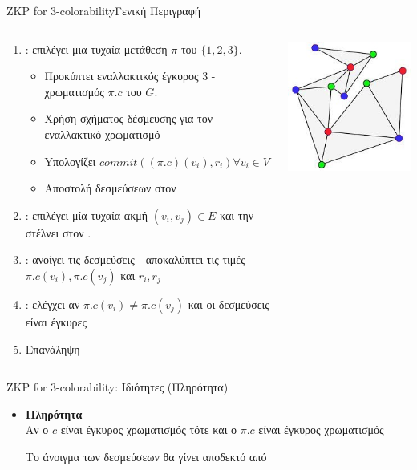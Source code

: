 \documentclass[handout]{beamer}
\begin{document}
\begin{frame}{ZKP for 3-colorability}{Γενική Περιγραφή}
\begin{columns}
\begin{small}
\begin{enumerate}
 	\setlength \itemsep{0.1em}
	\item \prv: επιλέγει μια τυχαία μετάθεση $\pi$ του $\{ 1,2,3 \}$. \pause
	\begin{itemize}
		\item Προκύπτει εναλλακτικός έγκυρος 3 - χρωματισμός $\pi.c$ του $G$. \pause
		\item Χρήση σχήματος δέσμευσης για τον εναλλακτικό χρωματισμό
		\item Yπολογίζει $commit( (\pi.c)(v_i), r_i) \forall v_i \in V$ 
		\item Αποστολή δεσμεύσεων στον \ver \pause
	\end{itemize}
	\item \ver: επιλέγει μία τυχαία ακμή $(v_i, v_j) \in E$ και την στέλνει στον \prv. \pause
	\item \prv: ανοίγει τις δεσμεύσεις - αποκαλύπτει τις τιμές $\pi.c(v_i),\pi.c(v_j)$ και $r_i, r_j$ \pause
	\item \ver: ελέγχει αν $\pi.c(v_i) \neq \pi.c(v_j)$ και οι δεσμεύσεις είναι έγκυρες
	\item Επανάληψη
\end{enumerate}
\end{small}
\begin{center}
\includegraphics[scale=0.6]{3cp2.jpg}
\end{center}
\end{columns}
\end{frame}

 
\begin{frame}{ZKP for 3-colorability: Ιδιότητες (Πληρότητα)} 
\begin{itemize}
\item \textbf{Πληρότητα}\\
Αν ο $c$ είναι έγκυρος χρωματισμός τότε και ο $\pi.c$ είναι έγκυρος χρωματισμός

Το άνοιγμα των δεσμεύσεων θα γίνει αποδεκτό από \ver
\end{itemize}
\end{frame}
\end{document}
